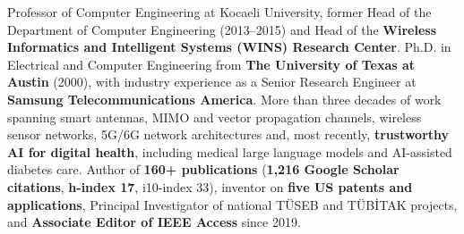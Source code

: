 
\begin{cvparagraph}
Professor of Computer Engineering at Kocaeli University, former Head of the Department of Computer Engineering (2013--2015) and Head of the \textbf{Wireless Informatics and Intelligent Systems (WINS) Research Center}. Ph.D. in Electrical and Computer Engineering from \textbf{The University of Texas at Austin} (2000), with industry experience as a Senior Research Engineer at \textbf{Samsung Telecommunications America}. More than three decades of work spanning smart antennas, MIMO and vector propagation channels, wireless sensor networks, 5G/6G network architectures and, most recently, \textbf{trustworthy AI for digital health}, including medical large language models and AI-assisted diabetes care. Author of \textbf{160+ publications} (\textbf{1,216 Google Scholar citations}, \textbf{h-index 17}, i10-index 33), inventor on \textbf{five US patents and applications}, Principal Investigator of national TÜSEB and TÜBİTAK projects, and \textbf{Associate Editor of IEEE Access} since 2019.
\end{cvparagraph}
